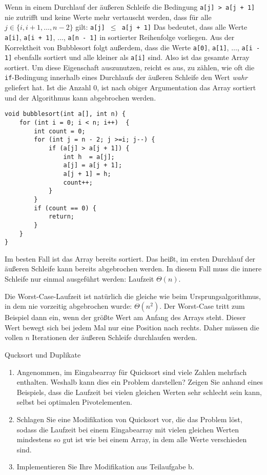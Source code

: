 \documentclass[11pt,a4paper]{article}
\begin{document}
\begin{loesung}
\begin{enumerate}
        Wenn in einem Durchlauf der äußeren Schleife die Bedingung \texttt{a[j] > a[j + 1]} nie zutrifft und keine Werte mehr vertauscht werden, dass für alle $j \in \{i, i + 1, \ldots, n - 2\}$ gilt: \texttt{a[j] }$\leq$\texttt{ a[j + 1]}
        Das bedeutet, dass alle Werte \texttt{a[i]}, \texttt{a[i + 1]}, $\ldots$, \texttt{a[n - 1]} in sortierter Reihenfolge vorliegen.
        Aus der Korrektheit von Bubblesort folgt außerdem, dass die Werte \texttt{a[0]}, \texttt{a[1]}, $\ldots$, \texttt{a[i - 1]} ebenfalls sortiert und alle kleiner als \texttt{a[i]} sind.
        Also ist das gesamte Array sortiert.
        Um diese Eigenschaft auszunutzen, reicht es aus, zu zählen, wie oft die \texttt{if}-Bedingung innerhalb eines Durchlaufs der äußeren Schleife den Wert \textit{wahr} geliefert hat.
        Ist die Anzahl 0, ist nach obiger Argumentation das Array sortiert und der Algorithmus kann abgebrochen werden.
        \begin{lstlisting}
void bubblesort(int a[], int n) {
    for (int i = 0; i < n; i++)  {
        int count = 0;
        for (int j = n - 2; j >=i; j--) {
            if (a[j] > a[j + 1]) {
                int h  = a[j];
                a[j] = a[j + 1];
                a[j + 1] = h;
                count++;
            }
        }
        if (count == 0) {
            return;
        }
    }
} 
        \end{lstlisting}
        Im besten Fall ist das Array bereits sortiert.
        Das heißt, im ersten Durchlauf der äußeren Schleife kann bereits abgebrochen werden.
        In diesem Fall muss die innere Schleife nur einmal ausgeführt werden: Laufzeit $\Theta(n)$.

        Die Worst-Case-Laufzeit ist natürlich die gleiche wie beim Ursprungsalgorithmus, in dem nie vorzeitig abgebrochen wurde: $\Theta(n^2)$.
        Der Worst-Case tritt zum Beispiel dann ein, wenn der größte Wert am Anfang des Arrays steht.
        Dieser Wert bewegt sich bei jedem Mal nur eine Position nach rechts.
        Daher müssen die vollen $n$ Iterationen der äußeren Schleife durchlaufen werden.
    \end{enumerate}
\end{loesung}

\begin{aufgabe}{2}{Qucksort und Duplikate}
    \begin{enumerate}
        \item Angenommen, im Eingabearray für Quicksort sind viele Zahlen mehrfach enthalten.
        Weshalb kann dies ein Problem darstellen?
        Zeigen Sie anhand eines Beispiels, dass die Laufzeit bei vielen gleichen Werten sehr schlecht sein kann, selbst bei optimalen Pivotelementen.
        \item Schlagen Sie eine Modifikation von Quicksort vor, die das Problem löst, sodass die Laufzeit bei einem Eingabearray mit vielen gleichen Werten mindestens so gut ist wie bei einem Array, in dem alle Werte verschieden sind.
        \item Implementieren Sie Ihre Modifikation aus Teilaufgabe b.
    \end{enumerate}
\end{aufgabe}
\end{document}
